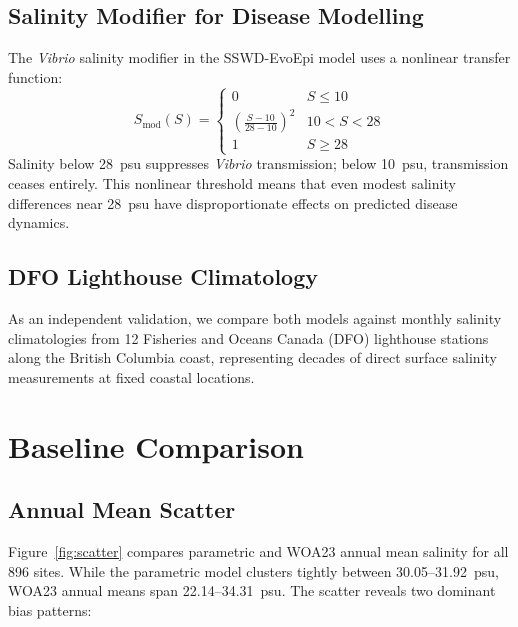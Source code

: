 \documentclass[11pt,a4paper]{article}
\begin{document}
\subsection{Salinity Modifier for Disease Modelling}

The \textit{Vibrio} salinity modifier in the SSWD-EvoEpi model uses a nonlinear
transfer function:
\begin{equation}
S_{\text{mod}}(S) = \begin{cases}
0 & S \leq 10 \\
\left(\frac{S - 10}{28 - 10}\right)^{2} & 10 < S < 28 \\
1 & S \geq 28
\end{cases}
\label{eq:sal_mod}
\end{equation}
Salinity below 28~psu suppresses \textit{Vibrio} transmission; below 10~psu,
transmission ceases entirely. This nonlinear threshold means that even modest
salinity differences near 28~psu have disproportionate effects on predicted
disease dynamics.

\subsection{DFO Lighthouse Climatology}

As an independent validation, we compare both models against monthly salinity
climatologies from 12 Fisheries and Oceans Canada (DFO) lighthouse stations
along the British Columbia coast, representing decades of direct surface salinity
measurements at fixed coastal locations.

\section{Baseline Comparison}

\subsection{Annual Mean Scatter}

Figure~\ref{fig:scatter} compares parametric and WOA23 annual mean salinity
for all 896 sites. While the parametric model clusters tightly between
30.05--31.92~psu, WOA23 annual means span 22.14--34.31~psu. The scatter reveals
two dominant bias patterns:
\end{document}
